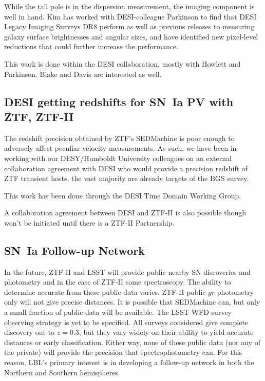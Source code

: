 While the tall pole is in the dispersion measurement, the
imaging component is well in hand. Kim has worked with DESI-colleague Parkinson to find that DESI Legacy Imaging Surveys DR8  perform
as well as previous releases to measuring galaxy surface brightnesses and angular sizes, and have identified new
pixel-level reductions that could further increase the performance.

This work is done within the DESI collaboration, mostly with Howlett and Parkinson.  Blake and Davis are interested as well.

\subsection{DESI getting redshifts for SN~Ia PV with ZTF, ZTF-II}
The redshift precision obtained by ZTF's SEDMachine is poor enough
to adversely affect peculiar velocity measurements.  As such, we have been in working with our DESY/Humboldt University
colleagues on an external collaboration agreement with DESI who would provide a precision redshift of ZTF transient hosts,
the vast majority are already targets of the BGS survey. 

This work has been done through the DESI Time Domain Working Group.

A collaboration agreement between DESI and ZTF-II is also possible though won't be initiated until there is a ZTF-II Partnership.

\subsection{SN~Ia Follow-up Network}
In the future, ZTF-II and LSST will provide public nearby SN discoveries and photometry and in the case of ZTF-II some spectroscopy.
The ability to determine accurate from these public data varies.  ZTF-II public $gr$ photometry only will not give precise distances.
It is possible that SEDMachine can, but only a small fraction of public data will be available.
The LSST WFD survey observing strategy is yet to be specified.  All surveys considered give complete discovery out to $z=0.3$, but
they vary widely on their ability to yield accurate distances or early classification.  Either way, none of these public data
(nor any of the private) will provide the precision that spectrophotometry can.  For this reason, LBL's primary interest
is in developing a follow-up network in both the Northern and Southern hemispheres.

